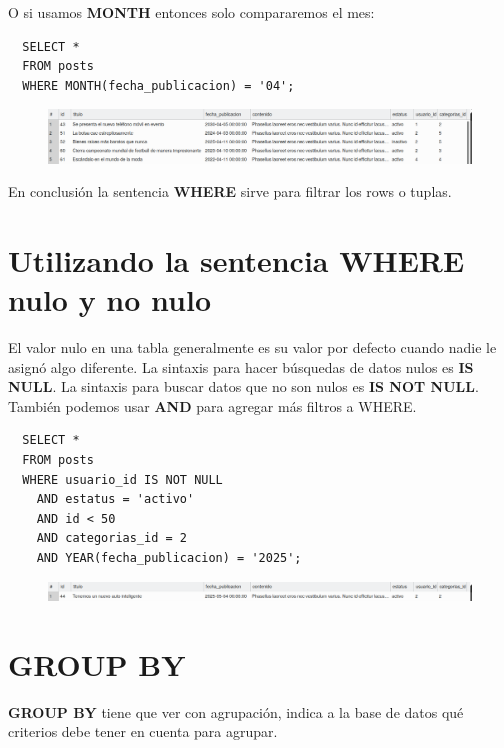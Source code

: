 \documentclass{article}
\begin{document}
O si usamos \textbf{MONTH} entonces solo compararemos el mes:\\

\begin{verbatim}
  SELECT *
  FROM posts
  WHERE MONTH(fecha_publicacion) = '04';
\end{verbatim}

\newpage

\begin{figure}[h!]
  \centering
  \includegraphics[scale=0.5]{./Pictures/116_where_month.png}
\end{figure}

En conclusión la sentencia \textbf{WHERE} sirve para filtrar los rows o tuplas.\\

\section{Utilizando la sentencia WHERE nulo y no nulo}%
El valor nulo en una tabla generalmente es su valor por defecto cuando nadie
le asignó algo diferente. La sintaxis para hacer búsquedas de datos nulos es
\textbf{IS NULL}. La sintaxis para buscar datos que no son nulos es \textbf{IS
NOT NULL}. También podemos usar \textbf{AND} para agregar más filtros a WHERE.

\begin{verbatim}
  SELECT *
  FROM posts
  WHERE usuario_id IS NOT NULL
    AND estatus = 'activo'
    AND id < 50
    AND categorias_id = 2
    AND YEAR(fecha_publicacion) = '2025';
\end{verbatim}

\begin{figure}[h!]
  \centering
  \includegraphics[scale=0.5]{./Pictures/117_where_and.png}
\end{figure}


\section{GROUP BY}%
\textbf{GROUP BY} tiene que ver con agrupación, indica a la base de datos qué
criterios debe tener en cuenta para agrupar.\\
\end{document}
